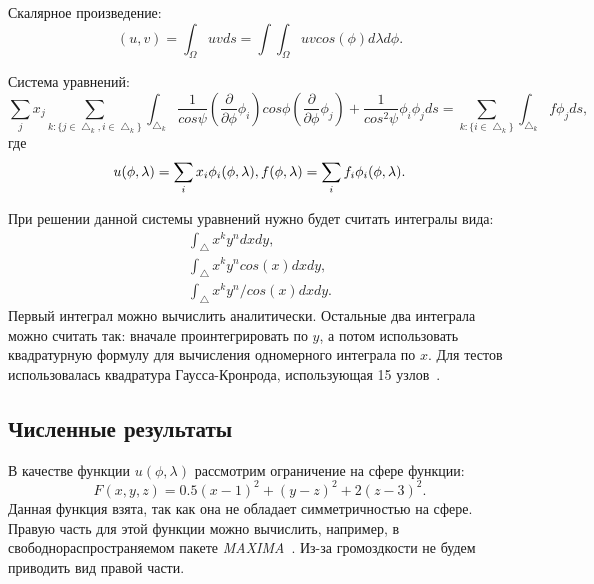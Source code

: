 \documentclass[a4paper,article]{article}
\begin{document}
Скалярное произведение:
\begin{equation*}
(u, v) = \int_\Omega u v ds = \int\int_\Omega u v cos(\phi)d\lambda d\phi.
\end{equation*}

Система уравнений:
\begin{equation*}
\sum_j x_j \sum_{k: \{j\in\bigtriangleup_k,
  i\in\bigtriangleup_k\}}\int_{\bigtriangleup_k}\frac{1}{cos\psi}(\frac{\partial}{\partial
  \phi} \phi_i) cos\phi (\frac{\partial}{\partial \phi}
\phi_j)+\frac{1}{cos^2\psi}\phi_i\phi_j ds =
\sum_{k:\{i\in\bigtriangleup_k\}}\int_{\bigtriangleup_k}f \phi_j ds, 
\end{equation*}
где
\begin{equation*}
u(\phi,\lambda)=\sum_i x_i \phi_i(\phi, \lambda),\\
f(\phi,\lambda)=\sum_i f_i \phi_i(\phi, \lambda).
\end{equation*}

При решении данной системы уравнений нужно будет считать интегралы вида:
\begin{equation*}
\begin{split}
\int_\bigtriangleup x^k y^n dx dy,\\
\int_\bigtriangleup x^k y^n cos(x) dx dy,\\
\int_\bigtriangleup x^k y^n / cos(x) dx dy.
\end{split}
\end{equation*}
Первый интеграл можно вычислить аналитически. Остальные два интеграла
можно считать так: вначале проинтегрировать по $y$, а потом использовать
квадратурную формулу для вычисления одномерного интеграла по $x$. Для
тестов использовалась квадратура Гаусса-Кронрода, использующая 15
узлов~\cite{kronrod}.

\subsection*{Численные результаты}
В качестве функции $u(\phi,\lambda)$ рассмотрим ограничение на сфере
функции:
\begin{equation*}
F(x,y,z)=0.5(x-1)^2+(y-z)^2+2(z-3)^2.
\end{equation*}
Данная функция взята, так как она не обладает симметричностью на
сфере. Правую часть для этой функции можно вычислить, например, в
свободнораспространяемом пакете {\it MAXIMA}~\cite{maxima}. Из-за громоздкости не
будем приводить вид правой части. 
\end{document}
